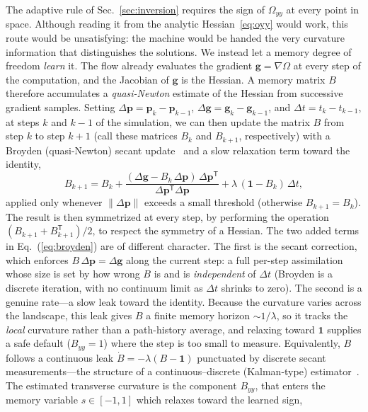 \documentclass[aip,preprint,amsmath,amssymb,floatfix]{revtex4-2}
\begin{document}
The adaptive rule of Sec.~\ref{sec:inversion} requires the sign of $\Omega_{yy}$ at every point in space.
Although reading it from the analytic Hessian~\eqref{eq:oyy} would work, this route would be unsatisfying:
the machine would be handed the very curvature information that distinguishes the
solutions. We instead let a memory degree of freedom \emph{learn} it. The flow
already evaluates the gradient $\mathbf g=\nabla\Omega$ at every step of the computation, and the
Jacobian of $\mathbf g$ is the Hessian. A memory matrix $B$ therefore accumulates a
\emph{quasi-Newton} estimate of the Hessian from successive gradient samples. Setting
$\Delta\mathbf p=\mathbf p_k-\mathbf p_{k-1}$, 
$\Delta\mathbf g=\mathbf g_k-\mathbf g_{k-1}$, and $\Delta t =t_k-t_{k-1}$, at steps $k$ and $k-1$ of the simulation, we can then update the matrix $B$ from step 
$k$ to step $k+1$ (call these matrices $B_k$ and $B_{k+1}$, respectively) with a
Broyden (quasi-Newton) secant update~\cite{broyden1965,nocedal2006} and a slow relaxation term 
toward the identity,
\begin{equation}
	B_{k+1}=B_k
	+\frac{(\Delta\mathbf g-B_k\,\Delta\mathbf p)\,\Delta\mathbf p^{\mathsf T}}
	{\Delta\mathbf p^{\mathsf T}\Delta\mathbf p}
	+\lambda\,(\mathbf{1}-B_k)\,\Delta t ,
	\label{eq:broyden}
\end{equation}
applied only whenever $\lVert\Delta\mathbf p\rVert$ exceeds a small threshold (otherwise
$B_{k+1}=B_k$). The result is then symmetrized at every step, by performing the operation $(B_{k+1}+B_{k+1}^{\mathsf T})/2$, to respect the symmetry of a
Hessian. The two added terms in Eq.~(\ref{eq:broyden}) 
are of different character. The first is the secant correction, which enforces
$B\,\Delta\mathbf p=\Delta\mathbf g$ along the current step: a full per-step
assimilation whose size is set by how wrong $B$ is and is \emph{independent} of
$\Delta t$ (Broyden is a discrete iteration, with no continuum limit as $\Delta t$
shrinks to zero). The second
is a genuine rate---a slow leak toward the identity. Because the curvature varies
across the landscape, this leak gives $B$ a finite memory horizon $\sim1/\lambda$, so
it tracks the \emph{local} curvature rather than a path-history average, and relaxing
toward $\mathbf{1}$ supplies a safe default ($B_{yy}=1$) where the step is too small to
measure. Equivalently, $B$ follows a continuous leak $\dot B=-\lambda(B-\mathbf{1})$
punctuated by discrete secant measurements---the structure of a continuous--discrete
(Kalman-type) estimator~\cite{nocedal2006}.
The estimated transverse curvature is the component $B_{yy}$, that enters the memory variable $s\in[-1,1]$ which relaxes toward the learned sign,
\end{document}
